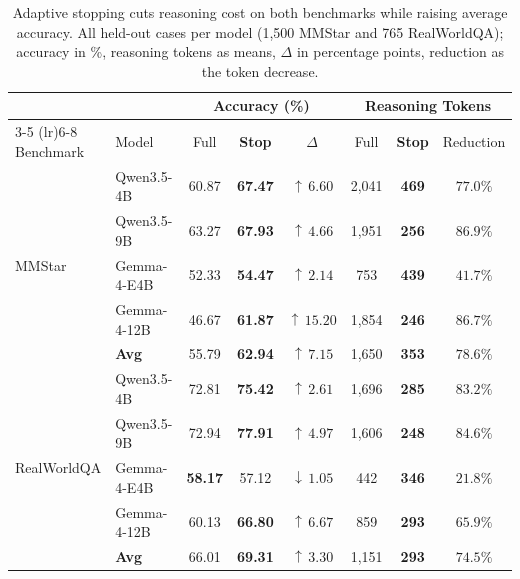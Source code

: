 \documentclass{article} %
\begin{document}
\begin{table}[t]
    \centering
    \scriptsize
    \renewcommand{\arraystretch}{0.95}
    \setlength{\tabcolsep}{2pt}
    \caption{Adaptive stopping cuts reasoning cost on both benchmarks while raising average accuracy. All held-out cases per model (1,500 MMStar and 765 RealWorldQA); accuracy in \%, reasoning tokens as means, $\Delta$ in percentage points, reduction as the token decrease.}
    \label{tab:early_stopping_main}
    \vspace{-1.5mm}
    \begin{tabular*}{\textwidth}{
        @{\extracolsep{\fill}}
        ll
        ccc
        ccc@{}
    }
        \toprule
        & &  \multicolumn{3}{c}{\textbf{Accuracy (\%)}}
        & \multicolumn{3}{c}{\textbf{Reasoning Tokens}} \\
        \cmidrule(lr){3-5}
        \cmidrule(lr){6-8}
        Benchmark
        & Model
        & Full
        & \textbf{Stop}
        & $\Delta$
        & Full
        & \textbf{Stop}
        & Reduction \\
        \midrule
        \multirow{5}{*}{MMStar}
        & Qwen3.5-4B & 60.87 & \textbf{67.47} & $\uparrow\,6.60$ & 2,041 & \textbf{469} & $77.0\%$ \\
        
        & Qwen3.5-9B & 63.27 & \textbf{67.93} & $\uparrow\,4.66$ & 1,951 & \textbf{256} & $86.9\%$ \\
        
        & Gemma-4-E4B & 52.33 & \textbf{54.47} & $\uparrow\,2.14$ & 753 & \textbf{439} & $41.7\%$ \\
        
        & Gemma-4-12B & 46.67 & \textbf{61.87} & $\uparrow\,15.20$ & 1,854 & \textbf{246} & $86.7\%$ \\
        \cmidrule(l){2-8}
        & \textbf{Avg} & 55.79 & \textbf{62.94} & $\uparrow\,7.15$ & 1,650 & \textbf{353} & $\mathbf{78.6\%}$ \\
        \midrule
        \multirow{5}{*}{RealWorldQA}
        & Qwen3.5-4B & 72.81 & \textbf{75.42} & $\uparrow\,2.61$ & 1,696 & \textbf{285} & $83.2\%$ \\
        
        & Qwen3.5-9B & 72.94 & \textbf{77.91} & $\uparrow\,4.97$ & 1,606 & \textbf{248} & $84.6\%$ \\
        
        & Gemma-4-E4B & \textbf{58.17} & 57.12 & $\downarrow\,1.05$ & 442 & \textbf{346} & $21.8\%$ \\
        
        & Gemma-4-12B & 60.13 & \textbf{66.80} & $\uparrow\,6.67$ & 859 & \textbf{293} & $65.9\%$ \\
        \cmidrule(l){2-8}
        & \textbf{Avg} & 66.01 & \textbf{69.31} & $\uparrow\,3.30$ & 1,151 & \textbf{293} & $\mathbf{74.5\%}$ \\
        \bottomrule
    \end{tabular*}
\end{table}
\end{document}
